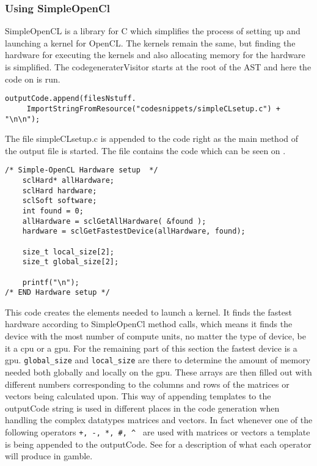 \subsubsection*{Using SimpleOpenCl}
SimpleOpenCL is a library for C which simplifies the process of setting up and launching a kernel for OpenCL.
The kernels remain the same, but finding the hardware for executing the kernels and also allocating memory for the hardware is simplified.
The codegeneraterVisitor starts at the root of the AST and here the code on  is run.

\begin{lstlisting}[caption=Call to setup SimpleOpenCL in the compiler,numbers=none,frame=tlrb,label={lst:OpenCLSetup}]
outputCode.append(filesNstuff.
	 ImportStringFromResource("codesnippets/simpleCLsetup.c") + "\n\n");
\end{lstlisting}
The file simpleCLsetup.c is appended to the code right as the main method of the output file is started.
The file contains the code which can be seen on .

\begin{lstlisting}[caption=SimpleOpenCL setup in the compiler,numbers=none,frame=tlrb,label={lst:OpenCLSetup2}]
/* Simple-OpenCL Hardware setup  */
	sclHard* allHardware;
	sclHard hardware;
	sclSoft software;
	int found = 0;
	allHardware = sclGetAllHardware( &found );
	hardware = sclGetFastestDevice(allHardware, found);

    size_t local_size[2];
    size_t global_size[2];

    printf("\n");
/* END Hardware setup */
\end{lstlisting}

This code creates the elements needed to launch a kernel.
It finds the fastest hardware according to SimpleOpenCl method calls, which means it finds the device with the most number of compute units, no matter the type of device, be it a \acrshort{cpu} or a \acrshort{gpu}.
For the remaining part of this section the fastest device is a \acrshort{gpu}.
\texttt{global\_size} and \texttt{local\_size} are there to determine the amount of memory needed both globally and locally on the \acrshort{gpu}.
These arrays are then filled out with different numbers corresponding to the columns and rows of the matrices or vectors being calculated upon.
This way of appending templates to the outputCode string is used in different places in the code generation when handling the complex datatypes matrices and vectors.
In fact whenever one of the following operators \texttt{+, -, *, \#, \^{} } are used with matrices or vectors a template is being appended to the outputCode.
See  for a description of what each operator will produce in \gls{gamble}.

